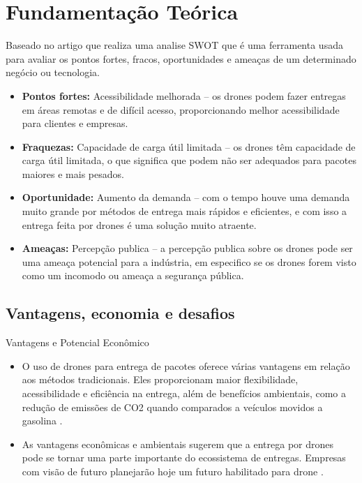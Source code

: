 \chapter{Fundamentação Teórica}
\label{ch:identificador}

Baseado no artigo \cite{yanique2023drone} que realiza uma analise SWOT que é uma ferramenta usada para avaliar os pontos fortes, fracos, oportunidades e ameaças de um determinado negócio ou tecnologia.
\begin{itemize}
    \item \textbf{Pontos fortes:} Acessibilidade melhorada – os drones podem fazer entregas em áreas remotas e de difícil acesso, proporcionando melhor acessibilidade para clientes e empresas.
    \item \textbf{Fraquezas:} Capacidade de carga útil limitada – os drones têm capacidade de carga útil limitada, o que significa que podem não ser adequados para pacotes maiores e mais pesados.
    \item \textbf{Oportunidade:} Aumento da demanda – com o tempo houve uma demanda muito grande por métodos de entrega mais rápidos e eficientes, e com isso a entrega feita por drones é uma solução muito atraente.
    \item \textbf{Ameaças:} Percepção publica – a percepção publica sobre os drones pode ser uma ameaça potencial para a indústria, em especifico se os drones forem visto como um incomodo ou ameaça a segurança pública.
\end{itemize}

    \section{Vantagens, economia e desafios}

Vantagens e Potencial Econômico
\begin{itemize}
    \item O uso de drones para entrega de pacotes oferece várias vantagens em relação aos métodos tradicionais. Eles proporcionam maior flexibilidade, acessibilidade e eficiência na entrega, além de benefícios ambientais, como a redução de emissões de CO2 quando comparados a veículos movidos a gasolina \cite{cornell2023drones}.
    \item As vantagens econômicas e ambientais sugerem que a entrega por drones pode se tornar uma parte importante do ecossistema de entregas. Empresas com visão de futuro planejarão hoje um futuro habilitado para drone \cite{cornell2023drones}.
\end{itemize}

